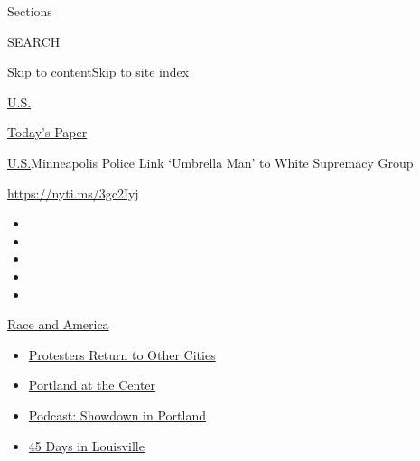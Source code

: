 Sections

SEARCH

\protect\hyperlink{site-content}{Skip to
content}\protect\hyperlink{site-index}{Skip to site index}

\href{https://www.nytimes3xbfgragh.onion/section/us}{U.S.}

\href{https://myaccount.nytimes3xbfgragh.onion/auth/login?response_type=cookie\&client_id=vi}{}

\href{https://www.nytimes3xbfgragh.onion/section/todayspaper}{Today's
Paper}

\href{/section/us}{U.S.}\textbar{}Minneapolis Police Link `Umbrella Man'
to White Supremacy Group

\url{https://nyti.ms/3gc2Iyj}

\begin{itemize}
\item
\item
\item
\item
\item
\end{itemize}

\href{https://www.nytimes3xbfgragh.onion/news-event/george-floyd-protests-minneapolis-new-york-los-angeles?action=click\&pgtype=Article\&state=default\&region=TOP_BANNER\&context=storylines_menu}{Race
and America}

\begin{itemize}
\tightlist
\item
  \href{https://www.nytimes3xbfgragh.onion/2020/07/26/us/protests-portland-seattle-trump.html?action=click\&pgtype=Article\&state=default\&region=TOP_BANNER\&context=storylines_menu}{Protesters
  Return to Other Cities}
\item
  \href{https://www.nytimes3xbfgragh.onion/2020/07/24/us/portland-oregon-protests-white-race.html?action=click\&pgtype=Article\&state=default\&region=TOP_BANNER\&context=storylines_menu}{Portland
  at the Center}
\item
  \href{https://www.nytimes3xbfgragh.onion/2020/07/23/podcasts/the-daily/portland-protests.html?action=click\&pgtype=Article\&state=default\&region=TOP_BANNER\&context=storylines_menu}{Podcast:
  Showdown in Portland}
\item
  \href{https://www.nytimes3xbfgragh.onion/interactive/2020/07/16/us/black-lives-matter-protests-louisville-breonna-taylor.html?action=click\&pgtype=Article\&state=default\&region=TOP_BANNER\&context=storylines_menu}{45
  Days in Louisville}
\end{itemize}

